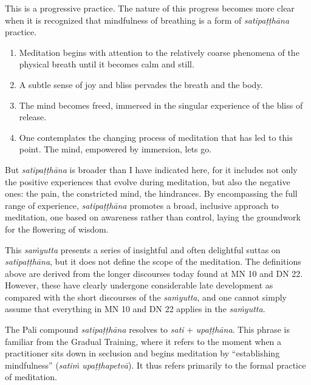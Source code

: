 \documentclass[12pt,openany]{book}%
\begin{document}
This is a progressive practice. The nature of this progress becomes more clear when it is recognized that mindfulness of breathing is a form of \textit{\textsanskrit{satipaṭṭhāna}} practice.

\begin{enumerate}%
\item Meditation begins with attention to the relatively coarse phenomena of the physical breath until it becomes calm and still.%
\item A subtle sense of joy and bliss pervades the breath and the body.%
\item The mind becomes freed, immersed in the singular experience of the bliss of release.%
\item One contemplates the changing process of meditation that has led to this point. The mind, empowered by immersion, lets go.%
\end{enumerate}

But \textit{\textsanskrit{satipaṭṭhāna}} is broader than I have indicated here, for it includes not only the positive experiences that evolve during meditation, but also the negative ones: the pain, the constricted mind, the hindrances. By encompassing the full range of experience, \textit{\textsanskrit{satipaṭṭhāna}} promotes a broad, inclusive approach to meditation, one based on awareness rather than control, laying the groundwork for the flowering of wisdom.

This \textit{\textsanskrit{saṁyutta}} presents a series of insightful and often delightful suttas on \textit{\textsanskrit{satipaṭṭhāna}}, but it does not define the scope of the meditation. The definitions above are derived from the longer discourses today found at MN 10 and DN 22. However, these have clearly undergone considerable late development as compared with the short discourses of the \textit{\textsanskrit{saṁyutta}}, and one cannot simply assume that everything in MN 10 and DN 22 applies in the \textit{\textsanskrit{saṁyutta}}.

The Pali compound \textit{\textsanskrit{satipaṭṭhāna}} resolves to \textit{sati} + \textit{\textsanskrit{upaṭṭhāna}}. This phrase is familiar from the Gradual Training, where it refers to the moment when a practitioner sits down in seclusion and begins meditation by “establishing mindfulness” (\textit{\textsanskrit{satiṁ} \textsanskrit{upaṭṭhapetvā}}). It thus refers primarily to the formal practice of meditation.
\end{document}
